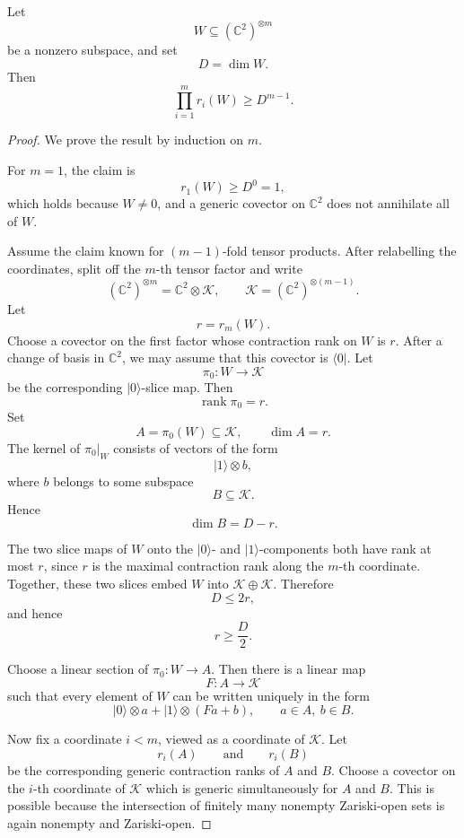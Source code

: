 \documentclass[10pt,a4paper]{amsart}
\DeclareMathOperator{\rank}{rank}
\begin{document}
\begin{lemma}
	\label{lem:multiplicative-slice-rank}
	Let
	\[
	W\subseteq(\mathbb C^2)^{\otimes m}
	\]
	be a nonzero subspace, and set
	\[
	D=\dim W.
	\]
	Then
	\[
	\prod_{i=1}^m r_i(W)\geq D^{m-1}.
	\]
\end{lemma}

\begin{proof}
	We prove the result by induction on \(m\).
	
	For \(m=1\), the claim is
	\[
	r_1(W)\geq D^0=1,
	\]
	which holds because \(W\neq0\), and a generic covector on \(\mathbb C^2\)
	does not annihilate all of \(W\).
	
	Assume the claim known for \((m-1)\)-fold tensor products.  After relabelling
	the coordinates, split off the \(m\)-th tensor factor and write
	\[
	(\mathbb C^2)^{\otimes m}
	=
	\mathbb C^2\otimes\mathcal K,
	\qquad
	\mathcal K=(\mathbb C^2)^{\otimes(m-1)}.
	\]
	Let
	\[
	r=r_m(W).
	\]
	Choose a covector on the first factor whose contraction rank on \(W\) is \(r\).
	After a change of basis in \(\mathbb C^2\), we may assume that this covector
	is \(\langle0|\).  Let
	\[
	\pi_0:W\to\mathcal K
	\]
	be the corresponding \(|0\rangle\)-slice map.  Then
	\[
	\rank \pi_0=r.
	\]
	Set
	\[
	A=\pi_0(W)\subseteq\mathcal K,
	\qquad
	\dim A=r.
	\]
	The kernel of \(\pi_0|_W\) consists of vectors of the form
	\[
	|1\rangle\otimes b,
	\]
	where \(b\) belongs to some subspace
	\[
	B\subseteq\mathcal K.
	\]
	Hence
	\[
	\dim B=D-r.
	\]
	
	The two slice maps of \(W\) onto the \(|0\rangle\)- and
	\(|1\rangle\)-components both have rank at most \(r\), since \(r\) is the
	maximal contraction rank along the \(m\)-th coordinate.  Together, these two
	slices embed \(W\) into \(\mathcal K\oplus\mathcal K\).  Therefore
	\[
	D\leq 2r,
	\]
	and hence
	\[
	r\geq \frac D2.
	\]
	
	Choose a linear section of \(\pi_0:W\to A\).  Then there is a linear map
	\[
	F:A\to\mathcal K
	\]
	such that every element of \(W\) can be written uniquely in the form
	\[
	|0\rangle\otimes a
	+
	|1\rangle\otimes(Fa+b),
	\qquad
	a\in A,\ b\in B.
	\]
	
	Now fix a coordinate \(i<m\), viewed as a coordinate of \(\mathcal K\).  Let
	\[
	r_i(A)
	\qquad\text{and}\qquad
	r_i(B)
	\]
	be the corresponding generic contraction ranks of \(A\) and \(B\).  Choose a
	covector on the \(i\)-th coordinate of \(\mathcal K\) which is generic
	simultaneously for \(A\) and \(B\).  This is possible because the intersection
	of finitely many nonempty Zariski-open sets is again nonempty and Zariski-open.
	

\end{proof}
\end{document}
